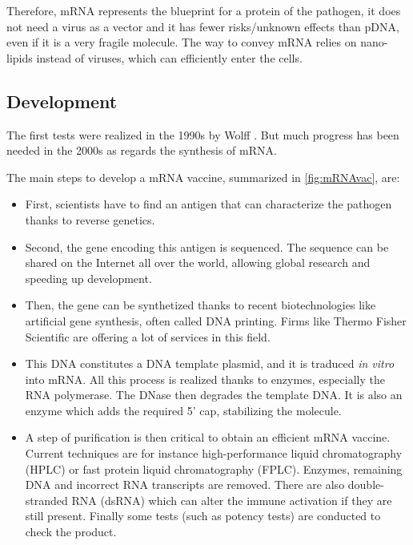 \documentclass{article}
\begin{document}
                Therefore, mRNA represents the blueprint for a protein of the pathogen, it does not need a virus as a vector
                    and it has fewer risks/unknown effects than pDNA, even if it is a very fragile molecule.
                The way to convey mRNA relies on nano-lipids instead of viruses, which can efficiently enter the cells.


        \subsection{Development}

            The first tests were realized in the 1990s by Wolff \autocite{wolffDirectGeneTransfer1990}.
            But much progress has been needed in the 2000s as regards the synthesis of mRNA.

            The main steps to develop a mRNA vaccine, summarized in \ref{fig:mRNAvac}, are:
            \begin{itemize}
                \item First, scientists have to find an antigen that can characterize the pathogen thanks to reverse genetics.
                \item Second, the gene encoding this antigen is sequenced. 
                    The sequence can be shared on the Internet all over the world, allowing global research and speeding up development.
                \item Then, the gene can be synthetized thanks to recent biotechnologies like artificial gene synthesis, often called DNA printing. 
                    Firms like Thermo Fisher Scientific are offering a lot of services in this field.
                \item This DNA constitutes a DNA template plasmid, and it is traduced \emph{in vitro} into mRNA.
                        All this process is realized thanks to enzymes, especially the RNA polymerase. The DNase then degrades the template DNA.
                        It is also an enzyme which adds the required 5' cap, stabilizing the molecule.
                \item A step of purification is then critical to obtain an efficient mRNA vaccine. 
                        Current techniques are for instance high-performance liquid chromatography (HPLC) or fast protein liquid chromatography (FPLC).
                        Enzymes, remaining DNA and incorrect RNA transcripts are removed.
                        There are also double-stranded RNA (dsRNA) which can alter the immune activation if they are still present.
                        Finally some tests (such as potency tests) are conducted to check the product.
            \end{itemize} %
\end{document}
